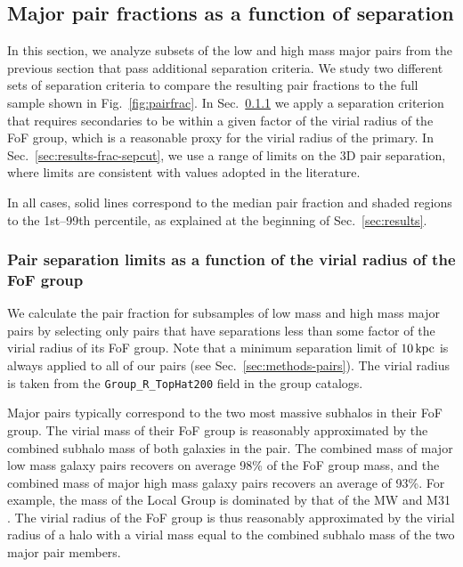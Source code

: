 \documentclass[linenumbers,twocolumn]{aastex631}
\begin{document}

\subsection{Major pair fractions as a function of separation}\label{sec:results-frac-cuts}
    In this section, we analyze subsets of the low and high mass major pairs from the previous section that pass additional separation criteria. 
    We study two different sets of separation criteria to compare the resulting pair fractions to the full sample shown in Fig.~\ref{fig:pairfrac}.
    In  Sec.~\ref{sec:results-frac-vircut} we apply a separation criterion that requires secondaries to be within a given factor of the virial radius of the FoF group, which is a reasonable proxy for the virial radius of the primary. 
    In Sec.~\ref{sec:results-frac-sepcut}, we use a range of limits on the 3D pair separation, where limits are consistent with values adopted in the literature. 
    
    In all cases, solid lines correspond to the median pair fraction and shaded regions to the 1st--99th percentile, as explained at the beginning of Sec.~\ref{sec:results}. 

\subsubsection{Pair separation limits as a function of the virial radius of the FoF group}\label{sec:results-frac-vircut}
    We calculate the pair fraction for subsamples of low mass and high mass major pairs by selecting only pairs that have separations less than some factor of the virial radius of its FoF group. 
    Note that a minimum separation limit of $10\mathrm{\,kpc}$ is always applied to all of our pairs (see Sec.~\ref{sec:methods-pairs}). 
    The virial radius is taken from the \texttt{Group\_R\_TopHat200} field in the group catalogs. 
   
    Major pairs typically correspond to the two most massive subhalos in their FoF group. 
    The virial mass of their FoF group is reasonably approximated by the combined subhalo mass of both galaxies in the pair.
    The combined mass of major low mass galaxy pairs recovers on average 98\% of the FoF group mass, and the combined mass of major high mass galaxy pairs recovers an average of 93\%. 
    For example, the mass of the Local Group is dominated by that of the MW and M31 \citep[e.g., ][]{Chamberlain2023}. 
    The virial radius of the FoF group is thus reasonably approximated by the virial radius of a halo with a virial mass equal to the combined subhalo mass of the two major pair members. %
    
\end{document}
